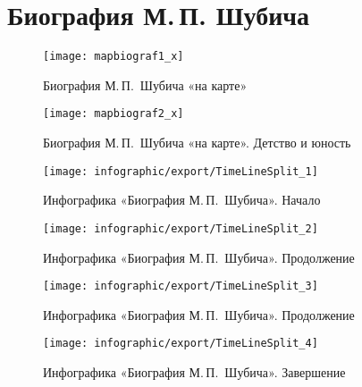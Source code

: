 ﻿\section{Биография М.\,П. Шубича}

\begin{figure}[H]
\texttt{[image: mapbiograf1\_x]}
\caption{Биография М.\,П.~Шубича «на карте»}
\label{fig:mapbiograf1}
\end{figure}

\begin{figure}[t]
\texttt{[image: mapbiograf2\_x]}
\caption{Биография М.\,П.~Шубича «на карте». Детство и юность}
\label{fig:mapbiograf2}
\end{figure}


\begin{figure}[t]
\texttt{[image: infographic/export/TimeLineSplit\_1]}
\caption{Инфографика «Биография М.\,П.~Шубича». Начало}
\label{fig:TimeLineSplit}
\end{figure}

\begin{figure}[t]
\ContinuedFloat %
\texttt{[image: infographic/export/TimeLineSplit\_2]}
\caption{Инфографика «Биография М.\,П.~Шубича». Продолжение}
\end{figure}

\begin{figure}[t]
\ContinuedFloat %
\texttt{[image: infographic/export/TimeLineSplit\_3]}
\caption{Инфографика «Биография М.\,П.~Шубича». Продолжение}
\end{figure}

\begin{figure}[t]
\ContinuedFloat %
\texttt{[image: infographic/export/TimeLineSplit\_4]}
\caption{Инфографика «Биография М.\,П.~Шубича». Завершение}
\end{figure}

\FloatBarrier

